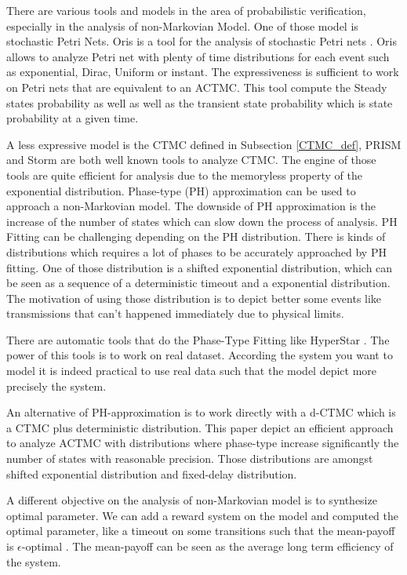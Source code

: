 There are various tools and models in the area of probabilistic verification, especially in the analysis of non-Markovian Model. One of those model is stochastic Petri Nets. Oris is a tool for the analysis of stochastic Petri nets \cite{Bucci2010}. Oris allows to analyze Petri net with plenty of time distributions for each event such as exponential, Dirac, Uniform or instant. The expressiveness is sufficient to work on Petri nets that are equivalent to an ACTMC. This tool compute the Steady states probability as well as well as the transient state probability which is state probability at a given time. 

A less expressive model is the CTMC defined in Subsection \ref{CTMC_def}, PRISM\cite{KNP11} and Storm \cite{DBLP:journals/corr/DehnertJK017} are both well known tools to analyze CTMC. The engine of those tools are quite efficient for analysis due to the memoryless property of the exponential distribution. Phase-type (PH) approximation can be used to approach a non-Markovian model. The downside of PH approximation is the increase of the number of states which can slow down the process of analysis.  PH Fitting can be challenging depending on the PH distribution\cite{DBLP:journals/corr/KorenciakKR14}.
There is kinds of distributions which requires a lot of phases to be accurately approached by PH fitting. One of those distribution is a shifted exponential distribution, which can be seen as a sequence of a deterministic timeout and a exponential distribution. The motivation of using those distribution is to depict better some events like transmissions that can't happened immediately due to physical limits.

There are automatic tools that do the Phase-Type Fitting like HyperStar \cite{10.1007/978-3-642-40725-3_13}. The power of this tools is to work on real dataset. According the system you want to model it is indeed practical to use real data such that the model depict more precisely the system. 


An alternative of PH-approximation is to work directly with a d-CTMC which is a CTMC plus deterministic distribution. This paper \cite{DBLP:journals/corr/BaierDKKR17} depict an efficient approach to analyze ACTMC with distributions where phase-type increase significantly the number of states with reasonable precision. Those distributions are amongst shifted exponential distribution and fixed-delay distribution.

A different objective on the analysis of non-Markovian model is to synthesize optimal parameter. We can add a reward system on the model and computed the optimal parameter, like a timeout on some transitions such that the mean-payoff is $\epsilon$-optimal \cite{DBLP:journals/corr/BaierDKKR17}. The mean-payoff can be seen as the average long term efficiency of the system.